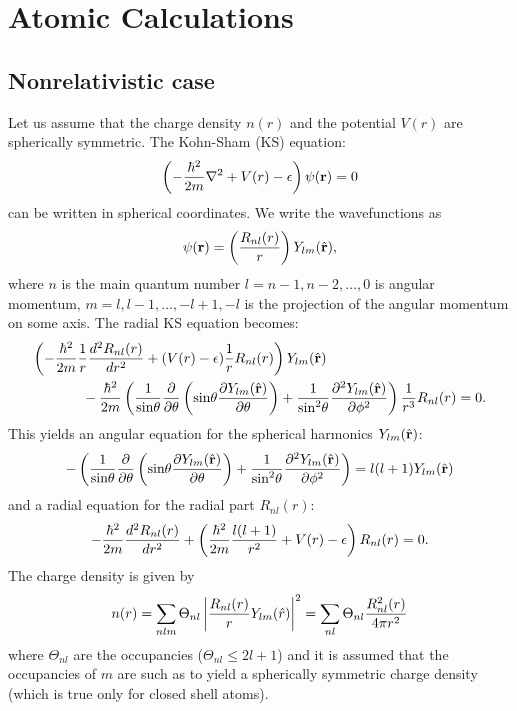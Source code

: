 \section{Atomic Calculations}

\subsection{Nonrelativistic case}

Let us assume that the charge density $n(r)$ and the potential $V(r)$
are spherically symmetric. The Kohn-Sham (KS) equation:
\begin{equation}
\left(-{\hbar^2\over 2m}\nabla^2 + V(r)-\epsilon\right) \psi({\bf r})=0
\end{equation}
can be written in spherical coordinates. We write the wavefunctions as
\begin{equation}
\psi({\bf r})=\left({R_{nl}(r)\over r}\right)Y_{lm}(\hat{{\bf r}}),
\end{equation}
where $n$ is the main quantum 
number $l=n-1,n-2,\dots,0$ is angular momentum, $m=l,l-1,\dots,-l+1,-l$
is the projection of the angular momentum on some axis. 
The radial KS equation becomes:
\begin{eqnarray}
\left(-{\hbar^2\over 2m} {1\over r} {d^2 R_{nl}(r)\over dr^2}
      +(V(r)-\epsilon) {1\over r} R_{nl}(r)
\right) Y_{lm}(\hat\r) \hskip 4cm \nonumber \\ \mbox{} - 
{\hbar^2\over 2m} \left({1\over\mbox{sin}\theta}{\partial\over\partial\theta}
                        \left(\mbox{sin}\theta{\partial Y_{lm}(\hat\r)
                                               \over\partial\theta}\right)
                      + {1\over\mbox{sin}^2\theta}
                           {\partial^2Y_{lm}(\hat\r)\over\partial\phi^2}
                  \right) {1\over r^3} R_{nl}(r) = 0.
\end{eqnarray}
This yields an angular equation for the spherical harmonics $Y_{lm}(\hat{{\bf r}})$:
\begin{equation}
-\left({1\over\mbox{sin}\theta}{\partial\over\partial\theta}
       \left(\mbox{sin}\theta{\partial Y_{lm}(\hat{{\bf r}})\over\partial\theta}
       \right)
     + {1\over\mbox{sin}^2\theta}
                           {\partial^2Y_{lm}(\hat{{\bf r}})\over\partial\phi^2}
\right) = l(l+1)Y_{lm}(\hat{{\bf r}})
\end{equation}
and a radial equation for the radial part $R_{nl}(r)$:
\begin{equation}
-{\hbar^2\over 2m} {d^2 R_{nl}(r)\over dr^2}
+\left( {\hbar^2\over 2m} {l(l+1)\over r^2} + V(r)-\epsilon
\right) R_{nl}(r) = 0.
\end{equation}
The charge density is given by
\begin{equation}
n(r) = \sum_{nlm} \Theta_{nl}\left |{R_{nl}(r)\over r}Y_{lm}(\hat r)\right|^2 
     = \sum_{nl} \Theta_{nl}{R^2_{nl}(r)\over 4\pi r^2}
\end{equation}
where $\Theta_{nl}$ are the occupancies ($\Theta_{nl}\le 2l+1$)
and it is assumed that the occupancies of $m$ are such as to yield
a spherically symmetric charge density (which is true only for closed
shell atoms).
